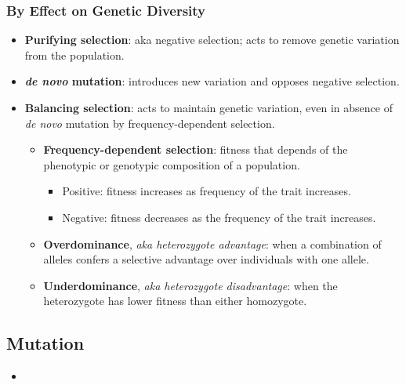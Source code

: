 \documentclass[12pt,a4paper]{article}
\begin{document}
\begin{itemize}
    \subsubsection{By Effect on Genetic Diversity}
    \begin{itemize}
        \item \textbf{Purifying selection}: aka negative selection; acts to remove genetic variation from the population.
        \item \textbf{\textit{de novo} mutation}: introduces new variation and opposes negative selection.
        \item \textbf{Balancing selection}: acts to maintain genetic variation, even in absence of \textit{de novo} mutation by frequency-dependent selection.
            \begin{itemize}
                \item \textbf{Frequency-dependent selection}: fitness that depends of the phenotypic or genotypic {\color{o-Sun}composition} of a population.
                    \begin{itemize}
                        \item {\color{pos}Positive}: fitness {\color{pos}increases} as frequency of the trait {\color{pos}increases}.
                        \item {\color{neg}Negative}: fitness {\color{neg}decreases} as the frequency of the trait {\color{pos}increases}.
                    \end{itemize}
                \item \textbf{Overdominance}, \textit{aka heterozygote advantage}: when a combination of alleles confers a selective advantage over individuals with one allele.
                \item \textbf{Underdominance}, \textit{aka heterozygote disadvantage}: when the heterozygote has lower fitness than either homozygote. 
            \end{itemize}
    \end{itemize}
\end{itemize}  
    
\subsection{Mutation}
\begin{itemize}
    \item 
\end{itemize}
\end{document}
